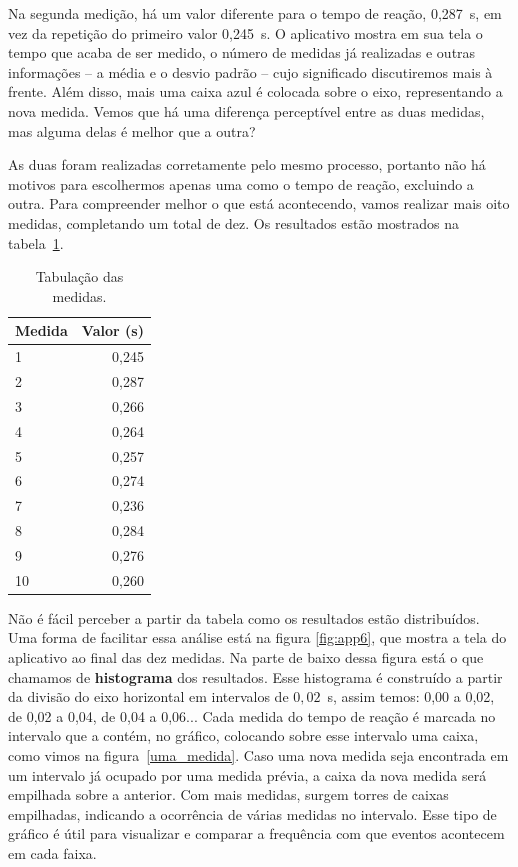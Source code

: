 \documentclass[12pt, a4paper]{article}
\begin{document}
Na segunda medição, há um valor diferente para o tempo de reação, 0,287~s, em vez da repetição do primeiro valor 0,245~s. O aplicativo mostra em sua tela o tempo que acaba de ser medido, o número de medidas já realizadas e outras informações -- a média e o desvio padrão -- cujo significado discutiremos mais à frente. Além disso, mais uma caixa azul é colocada sobre o eixo, representando a nova medida. Vemos que há uma diferença perceptível entre as duas medidas, mas alguma delas é melhor que a outra? 

As duas foram realizadas corretamente pelo mesmo processo, portanto não há motivos para escolhermos apenas uma como o tempo de reação, excluindo a outra. Para compreender melhor o que está acontecendo, vamos realizar mais oito medidas, completando um total de dez. Os resultados estão mostrados na tabela~\ref{tab:widgets}.

\begin{table} [H]
\centering
\begin{tabular}{l|r}
Medida & Valor (s) \\\hline
1 & 0,245 \\
2 & 0,287 \\
3 & 0,266 \\
4 & 0,264 \\
5 & 0,257 \\
6 & 0,274 \\
7 & 0,236 \\
8 & 0,284 \\
9 & 0,276 \\
10 & 0,260\\
\end{tabular}
\caption{\label{tab:widgets}Tabulação das medidas.}
\end{table}

Não é fácil perceber a partir da tabela como os resultados estão distribuídos. Uma forma de facilitar essa análise está na figura \ref{fig:app6}, que mostra a tela do aplicativo ao final das dez medidas. Na parte de baixo dessa figura está o que chamamos de \textbf{histograma} dos resultados. Esse histograma é construído a partir da divisão do eixo horizontal em intervalos de $0,02$~s, assim temos: 0,00 a 0,02, de 0,02 a 0,04, de 0,04 a 0,06... Cada medida do tempo de reação é marcada no intervalo que a contém, no gráfico, colocando sobre esse intervalo uma caixa, como vimos na figura~\ref{uma_medida}. Caso uma nova medida seja encontrada em um intervalo já ocupado por uma medida prévia, a caixa da nova medida será empilhada sobre a anterior. Com mais medidas, surgem torres de caixas empilhadas, indicando a ocorrência de várias medidas no intervalo. Esse tipo de gráfico é útil para visualizar e comparar a frequência com que eventos acontecem em cada faixa.
\end{document}
